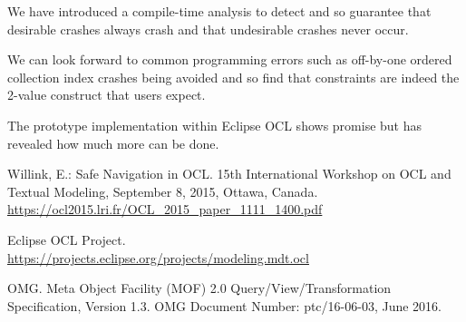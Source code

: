 \documentclass{llncs}
\begin{document}
We have introduced a compile-time analysis to detect and so guarantee that desirable crashes always crash and that undesirable crashes never occur.

We can look forward to common programming errors such as off-by-one ordered collection index crashes being avoided and so find that constraints are indeed the 2-value construct that users expect.

The prototype implementation within Eclipse OCL shows promise but has revealed how much more can be done.


%
%
\begin{thebibliography}{}
%




Willink, E.: Safe Navigation in OCL.
15th International Workshop on OCL and Textual Modeling, September 8, 2015, Ottawa, Canada.
\url{https://ocl2015.lri.fr/OCL\_2015\_paper\_1111\_1400.pdf}


Eclipse OCL Project.\\
\url{https://projects.eclipse.org/projects/modeling.mdt.ocl}

OMG. Meta Object Facility (MOF) 2.0 Query/View/Transformation Specification, Version 1.3.
OMG Document Number: ptc/16-06-03, June 2016.


\end{thebibliography}
\end{document}
